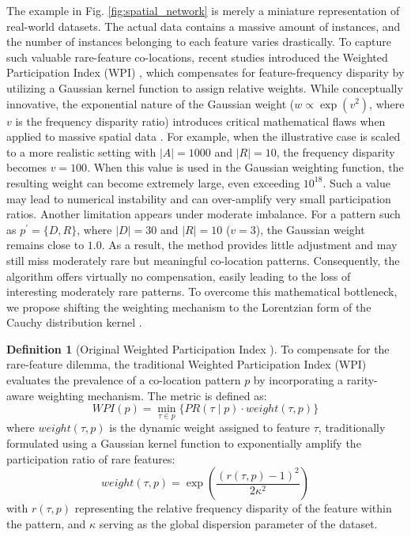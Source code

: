 \documentclass[12pt, letterpaper]{template}
\theoremstyle{definition}
\newtheorem{definition}{Definition}
\begin{document}
The example in Fig. \ref{fig:spatial_network} is merely a miniature representation of real-world datasets. The actual data contains a massive amount of instances, and the number of instances belonging to each feature varies drastically. To capture such valuable rare-feature co-locations, recent studies introduced the Weighted Participation Index (WPI) \cite{yang2021efficient}, which compensates for feature-frequency disparity by utilizing a Gaussian kernel function to assign relative weights. While conceptually innovative, the exponential nature of the Gaussian weight ($w \propto \exp(v^2)$, where $v$ is the frequency disparity ratio) introduces critical mathematical flaws when applied to massive spatial data \cite{yang2021efficient}. For example, when the illustrative case is scaled to a more realistic setting with $|A| = 1000$ and $|R| = 10$, the frequency disparity becomes $v = 100$. When this value is used in the Gaussian weighting function, the resulting weight can become extremely large, even exceeding $10^{18}$. Such a value may lead to numerical instability and can over-amplify very small participation ratios. Another limitation appears under moderate imbalance. For a pattern such as $p^{\prime} = \{D, R\}$, where $|D| = 30$ and $|R| = 10$ ($v = 3$), the Gaussian weight remains close to $1.0$. As a result, the method provides little adjustment and may still miss moderately rare but meaningful co-location patterns. Consequently, the algorithm offers virtually no compensation, easily leading to the loss of interesting moderately rare patterns. To overcome this mathematical bottleneck, we propose shifting the weighting mechanism to the Lorentzian form of the Cauchy distribution kernel \cite{carrillo2010generalized}.

\begin{definition}[Original Weighted Participation Index \cite{yang2021efficient}]
To compensate for the rare-feature dilemma, the traditional Weighted Participation Index (WPI) evaluates the prevalence of a co-location pattern $p$ by incorporating a rarity-aware weighting mechanism. The metric is defined as:
\begin{equation}
WPI(p) = \min_{\tau \in p} \{PR(\tau \mid p) \cdot weight(\tau, p) \}
\end{equation}
where $weight(\tau, p)$ is the dynamic weight assigned to feature $\tau$, traditionally formulated using a Gaussian kernel function to exponentially amplify the participation ratio of rare features:
\begin{equation}
weight(\tau, p) = \exp\left( \frac{(r(\tau, p) - 1)^2}{2\kappa^2} \right)
\end{equation}
with $r(\tau, p)$ representing the relative frequency disparity of the feature within the pattern, and $\kappa$ serving as the global dispersion parameter of the dataset.
\end{definition}
\end{document}
